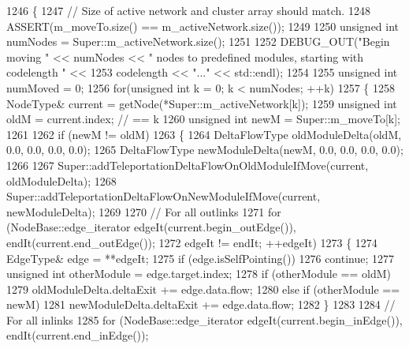 \begin{DoxyCode}
1246 \{
1247     \textcolor{comment}{// Size of active network and cluster array should match.}
1248     ASSERT(m\_moveTo.size() == m\_activeNetwork.size());
1249 
1250     \textcolor{keywordtype}{unsigned} \textcolor{keywordtype}{int} numNodes = Super::m\_activeNetwork.size();
1251 
1252     DEBUG\_OUT(\textcolor{stringliteral}{"Begin moving "} << numNodes << \textcolor{stringliteral}{" nodes to predefined modules, starting with codelength "} <<
1253             codelength << \textcolor{stringliteral}{"..."} << std::endl);
1254 
1255     \textcolor{keywordtype}{unsigned} \textcolor{keywordtype}{int} numMoved = 0;
1256     \textcolor{keywordflow}{for}(\textcolor{keywordtype}{unsigned} \textcolor{keywordtype}{int} k = 0; k < numNodes; ++k)
1257     \{
1258         NodeType& current = getNode(*Super::m\_activeNetwork[k]);
1259         \textcolor{keywordtype}{unsigned} \textcolor{keywordtype}{int} oldM = current.index; \textcolor{comment}{// == k}
1260         \textcolor{keywordtype}{unsigned} \textcolor{keywordtype}{int} newM = Super::m\_moveTo[k];
1261 
1262         \textcolor{keywordflow}{if} (newM != oldM)
1263         \{
1264             DeltaFlowType oldModuleDelta(oldM, 0.0, 0.0, 0.0, 0.0);
1265             DeltaFlowType newModuleDelta(newM, 0.0, 0.0, 0.0, 0.0);
1266 
1267             Super::addTeleportationDeltaFlowOnOldModuleIfMove(current, oldModuleDelta);
1268             Super::addTeleportationDeltaFlowOnNewModuleIfMove(current, newModuleDelta);
1269 
1270             \textcolor{comment}{// For all outlinks}
1271             \textcolor{keywordflow}{for} (NodeBase::edge\_iterator edgeIt(current.begin\_outEdge()), endIt(current.end\_outEdge());
1272                     edgeIt != endIt; ++edgeIt)
1273             \{
1274                 EdgeType& edge = **edgeIt;
1275                 \textcolor{keywordflow}{if} (edge.isSelfPointing())
1276                     \textcolor{keywordflow}{continue};
1277                 \textcolor{keywordtype}{unsigned} \textcolor{keywordtype}{int} otherModule = edge.target.index;
1278                 \textcolor{keywordflow}{if} (otherModule == oldM)
1279                     oldModuleDelta.deltaExit += edge.data.flow;
1280                 \textcolor{keywordflow}{else} \textcolor{keywordflow}{if} (otherModule == newM)
1281                     newModuleDelta.deltaExit += edge.data.flow;
1282             \}
1283 
1284             \textcolor{comment}{// For all inlinks}
1285             \textcolor{keywordflow}{for} (NodeBase::edge\_iterator edgeIt(current.begin\_inEdge()), endIt(current.end\_inEdge());

\end{DoxyCode}
